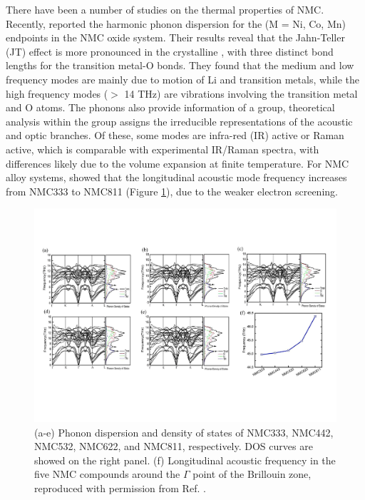 \documentclass[journal=jacsat,manuscript=article]{achemso}
\begin{document}
There have been a number of studies on the thermal properties of NMC. 
Recently, \citeauthor{yang2020chemical} reported the harmonic phonon dispersion for the  (M = Ni, Co, Mn) endpoints in the NMC oxide system. \cite{yang2020chemical}
Their results reveal that the Jahn-Teller (JT) effect is more pronounced in the crystalline , with three distinct bond lengths for the transition metal-O bonds. They found that the medium and low frequency modes are mainly due to motion of Li and transition metals, while the high frequency modes ($>$ 14 THz) are vibrations involving the transition metal and O atoms.
The phonons also provide information of a group, theoretical analysis within the group assigns the irreducible representations of the acoustic and optic branches. Of these, some modes are infra-red (IR) active or Raman active, which is comparable with experimental IR/Raman spectra, with differences likely due to the volume expansion at finite temperature. \cite{yang2019highly} 
For NMC alloy systems, \citeauthor{sun_electronic_2017} showed that the longitudinal acoustic mode frequency increases from NMC333 to NMC811 (Figure \ref{figure_phonon}), due to the weaker electron screening.\cite{sun_electronic_2017}

\begin{figure}[]
  \centering
    \includegraphics[width=14cm]{Figures/P_phonon_2.pdf}
    \caption{(a-e) Phonon dispersion and density of states of NMC333, NMC442, NMC532, NMC622, and NMC811, respectively. DOS curves are showed on the right panel. (f) Longitudinal acoustic frequency in the five NMC compounds around the $\Gamma$ point of the Brillouin zone, reproduced with permission from Ref. .}
  \label{figure_phonon}
\end{figure}
\end{document}
